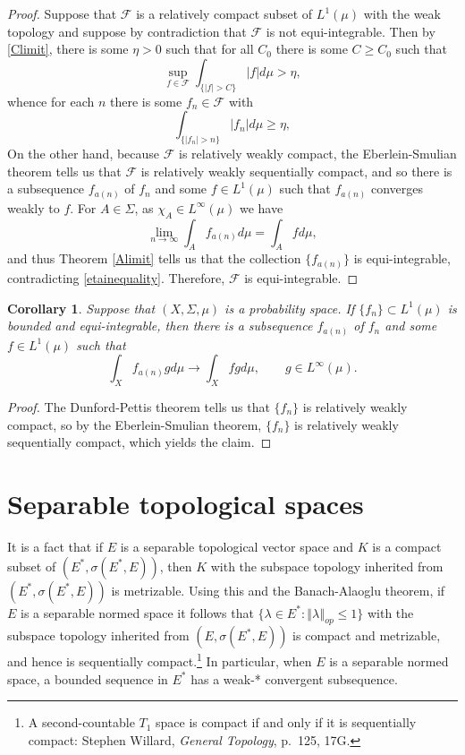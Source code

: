 \documentclass{article}
\newcommand{\norm}[1]{\left\Vert #1 \right\Vert}
\newtheorem{corollary}[theorem]{Corollary}
\theoremstyle{definition}
\begin{document}
\begin{proof}
Suppose that $\mathscr{F}$ is a relatively compact subset of $L^1(\mu)$ with the weak topology and suppose
by contradiction that $\mathscr{F}$ is not equi-integrable. 
Then by \eqref{Climit}, there is some $\eta >0$  such that for all $C_0$ there is some $C \geq C_0$ such that
\[
\sup_{f \in \mathscr{F}} \int_{\{|f| > C\}} |f| d\mu > \eta,
\]
whence for each $n$ there is some $f_n \in \mathscr{F}$ with
\begin{equation}
\int_{\{|f_n|>n\}} |f_n| d\mu \geq \eta,
\label{etainequality}
\end{equation}
On the other hand, because $\mathscr{F}$ is relatively weakly compact, the Eberlein-Smulian theorem tells us that
$\mathscr{F}$ is relatively weakly sequentially compact, and so there is a subsequence $f_{a(n)}$ of $f_n$ and some
$f \in L^1(\mu)$ such that $f_{a(n)}$ converges weakly to $f$. 
For  $A \in \Sigma$, as $\chi_A \in L^\infty(\mu)$ we have
\[
\lim_{n \to \infty} \int_A f_{a(n)} d\mu = \int_A f d\mu,
\]
and thus Theorem \ref{Alimit}  tells us that the collection $\{f_{a(n)}\}$ is equi-integrable, contradicting \eqref{etainequality}.
Therefore, $\mathscr{F}$ is equi-integrable.
\end{proof}


\begin{corollary}
Suppose that $(X,\Sigma,\mu)$ is a probability space. If $\{f_n\} \subset L^1(\mu)$ is
bounded and equi-integrable, then there is a subsequence $f_{a(n)}$ of $f_n$ and some $f \in L^1(\mu)$ such that
\[
\int_X f_{a(n)} g d\mu \to \int_X f g d\mu, \qquad g \in L^\infty(\mu).
\]
\end{corollary}
\begin{proof}
The Dunford-Pettis theorem tells us that $\{f_n\}$ is relatively weakly compact, so by the Eberlein-Smulian theorem,
$\{f_n\}$ is relatively weakly sequentially compact, which yields the claim.
\end{proof}



\section{Separable topological spaces}
It is a fact that if $E$ is a separable topological vector space and $K$ is a compact subset of
$(E^*,\sigma(E^*,E))$, then $K$ with the subspace topology inherited from
$(E^*,\sigma(E^*,E))$ is metrizable. Using this and the Banach-Alaoglu theorem, if
$E$ is a separable normed space it follows that
$\{\lambda \in E^*: \norm{\lambda}_{op} \leq 1\}$
with the subspace topology inherited from
$(E,\sigma(E^*,E))$ is compact and metrizable, 
and hence is sequentially compact.\footnote{A second-countable $T_1$ space is compact if and only if it is
sequentially compact: Stephen Willard, {\em General Topology}, p.~125, 17G.}
In particular, when $E$ is a separable normed space, a bounded sequence in $E^*$ has a weak-* convergent subsequence.
\end{document}

